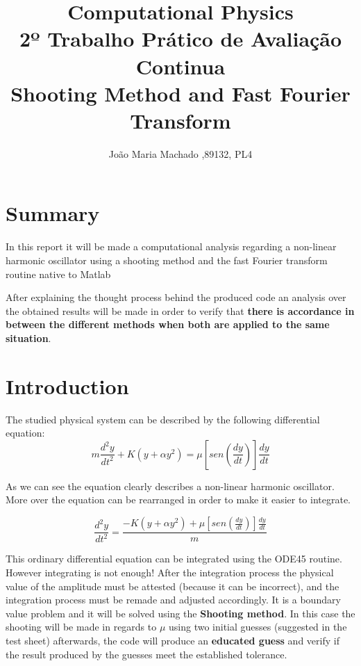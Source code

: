 \documentclass[letterpaper,12pt]{article}
\title{
  Computational Physics \\
  \large 2º Trabalho Prático de Avaliação Continua \\
  Shooting Method and Fast Fourier Transform}
\author{João Maria Machado ,89132, PL4}
\begin{document}

\maketitle


\newpage
\tableofcontents
\newpage

\section{Summary}

In this report it will be made a computational analysis regarding a non-linear harmonic oscillator using a shooting method and the fast Fourier transform routine native to Matlab
\indent

After explaining the thought process behind the produced code an analysis over the obtained results will be made in order to verify that \textbf{there is accordance in between the different methods  when both are applied to the same situation}.


\section{Introduction} 
The studied physical system can be described by the following differential equation:  
\begin{equation}
m\frac{d^2y}{dt^2}+K(y+\alpha y^2)=\mu\left[ sen\left(\frac{dy}{dt}\right)\right]\frac{dy}{dt} \label{1}
\end{equation}

\indent 
As we can see the equation clearly describes a non-linear harmonic oscillator. More over the equation can be rearranged in order to make it easier to integrate. 
 
\begin{equation}
\frac{d^2y}{dt^2}=\frac{-K(y+\alpha y^2)+\mu\left[ sen\left(\frac{dy}{dt}\right)\right]\frac{dy}{dt}}{m} \label{2}
\end{equation}

\indent
This ordinary differential equation can be integrated using the ODE45 routine. However integrating is not enough! After the integration process the physical value of the amplitude must be attested (because it can be incorrect), and the integration process must be remade and adjusted accordingly. It is a boundary value problem and it will be solved using the \textbf{Shooting method}. In this case the shooting will be made in regards to \textbf{$\mu$} using two initial guesses (suggested in the test sheet) afterwards, the code will produce an \textbf{educated guess} and verify if the result produced by the guesses meet the established tolerance.
\end{document}
